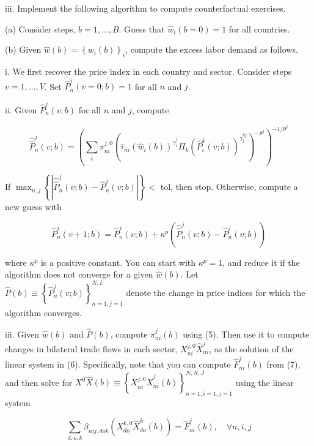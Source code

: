 \documentclass[12pt,oneside,reqno]{article}
\begin{document}
\begin{enumerate}
iii. Implement the following algorithm to compute counterfactual exercises.

(a) Consider steps, $b=1, \ldots, B$. Guess that $\hat{w}_{i}(b=0)=1$ for all countries.

(b) Given $\hat{w}(b)=\left\{w_{i}(b)\right\}_{i}$, compute the excess labor demand as follows.

i. We first recover the price index in each country and sector. Consider steps $v=1, \ldots, V$. Set $\hat{P}_{n}^{j}(v=0 ; b)=1$ for all $n$ and $j$.

ii. Given $\hat{P}_{n}^{j}(v ; b)$ for all $n$ and $j$, compute

\begin{equation*}
\hat{\hat{P}}_{n}^{j}(v ; b)=\left(\sum_{i} \pi_{n i}^{j, 0}\left(\hat{\tau}_{n i}\left(\hat{w}_{i}(b)\right)^{\gamma_{i}^{j}} \Pi_{k}\left(\hat{P}_{i}^{k}(v ; b)\right)^{\gamma_{i}^{k j}}\right)^{-\theta^{j}}\right)^{-1 / \theta^{j}}
\end{equation*}

If $\max _{n, j}\left\{\left|\hat{\hat{P}}_{n}^{j}(v ; b)-\hat{P}_{n}^{j}(v ; b)\right|\right\}<$ tol, then stop. Otherwise, compute a new guess with

\begin{equation*}
\hat{P}_{n}^{j}(v+1 ; b)=\hat{P}_{n}^{j}(v ; b)+\kappa^{p}\left(\hat{\hat{P}}_{n}^{j}(v ; b)-\hat{P}_{n}^{j}(v ; b)\right)
\end{equation*}

where $\kappa^{p}$ is a positive constant. You can start with $\kappa^{p}=1$, and reduce it if the algorithm does not converge for a given $\hat{w}(b)$. Let $\hat{P}(b) \equiv\left\{\hat{P}_{n}^{j}(v ; b)\right\}_{n=1, j=1}^{N, I}$ denote the change in price indices for which the algorithm converges.

iii. Given $\hat{w}(b)$ and $\hat{P}(b)$, compute $\hat{\pi}_{n i}^{j}(b)$ using (5). Then use it to compute changes in bilateral trade flows in each sector, $X_{n i}^{j, 0} \hat{X}_{n i}^{j}$, as the solution of the linear system in (6). Specifically, note that you can compute $\hat{F}_{n i}^{j}(b)$ from (7), and then solve for $X^{0} \hat{X}(b) \equiv\left\{X_{n i}^{j, 0} \hat{X}_{n i}^{j}(b)\right\}_{n=1, i=1, j=1}^{N, N, J}$ using the linear system

\begin{equation*}
\sum_{d, o, k} \beta_{n i j, d o k}\left(X_{d o}^{k, 0} \hat{X}_{d o}^{k}(b)\right)=\hat{F}_{n i}^{j}(b), \quad \forall n, i, j
\end{equation*}


\end{enumerate}
\end{document}
